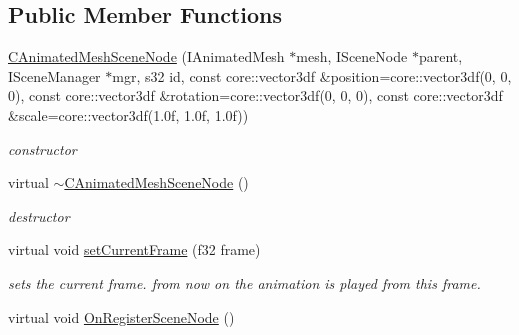 \subsection*{Public Member Functions}
\begin{DoxyCompactItemize}
\item 
\hypertarget{classirr_1_1scene_1_1_c_animated_mesh_scene_node_aa5c873407001f5531850c570c335a80f}{\hyperlink{classirr_1_1scene_1_1_c_animated_mesh_scene_node_aa5c873407001f5531850c570c335a80f}{C\-Animated\-Mesh\-Scene\-Node} (I\-Animated\-Mesh $\ast$mesh, I\-Scene\-Node $\ast$parent, I\-Scene\-Manager $\ast$mgr, s32 id, const core\-::vector3df \&position=core\-::vector3df(0, 0, 0), const core\-::vector3df \&rotation=core\-::vector3df(0, 0, 0), const core\-::vector3df \&scale=core\-::vector3df(1.\-0f, 1.\-0f, 1.\-0f))}\label{classirr_1_1scene_1_1_c_animated_mesh_scene_node_aa5c873407001f5531850c570c335a80f}

\begin{DoxyCompactList}\small\item\em constructor \end{DoxyCompactList}\item 
\hypertarget{classirr_1_1scene_1_1_c_animated_mesh_scene_node_a044da86462c4220581d993e645fe41fc}{virtual \hyperlink{classirr_1_1scene_1_1_c_animated_mesh_scene_node_a044da86462c4220581d993e645fe41fc}{$\sim$\-C\-Animated\-Mesh\-Scene\-Node} ()}\label{classirr_1_1scene_1_1_c_animated_mesh_scene_node_a044da86462c4220581d993e645fe41fc}

\begin{DoxyCompactList}\small\item\em destructor \end{DoxyCompactList}\item 
virtual void \hyperlink{classirr_1_1scene_1_1_c_animated_mesh_scene_node_ac2b446c5e0b2b05b0004db1626c54253}{set\-Current\-Frame} (f32 frame)
\begin{DoxyCompactList}\small\item\em sets the current frame. from now on the animation is played from this frame. \end{DoxyCompactList}\item 
\hypertarget{classirr_1_1scene_1_1_c_animated_mesh_scene_node_a28eb2e5d505db33854b30e2015a3c770}{virtual void \hyperlink{classirr_1_1scene_1_1_c_animated_mesh_scene_node_a28eb2e5d505db33854b30e2015a3c770}{On\-Register\-Scene\-Node} ()}\label{classirr_1_1scene_1_1_c_animated_mesh_scene_node_a28eb2e5d505db33854b30e2015a3c770}


\end{DoxyCompactItemize}
